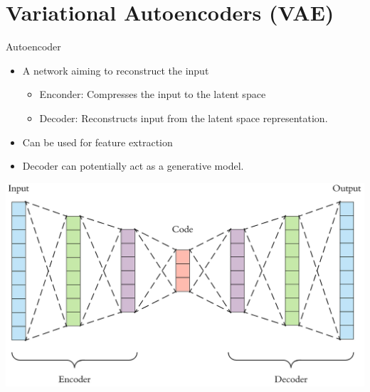\documentclass[./main.tex]{subfiles}
\begin{document}
\section{Variational Autoencoders (VAE)}
\label{sec:orga88d442}
\begin{frame}[label={sec:orgd79a8bb}]{Autoencoder}
\begin{itemize}
\item A network aiming to reconstruct the input
\begin{itemize}
\item Enconder: Compresses the input to the latent space
\item Decoder: Reconstructs input from the latent space representation.
\end{itemize}
\item Can be used for feature extraction
\item Decoder can potentially act as a generative model.
\end{itemize}
\begin{adjustbox}{width=\textwidth,totalheight=0.6\paperheight,keepaspectratio,center}
\includegraphics[width=\textwidth]{./figs/autoencoder.png}
\end{adjustbox}
\end{frame}
\end{document}
